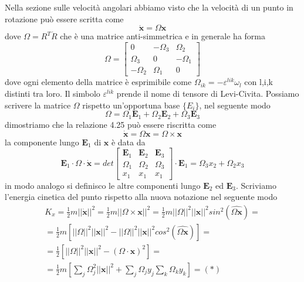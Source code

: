 Nella sezione sulle velocit\`{a} angolari abbiamo visto che la velocit\`{a} di un punto in rotazione pu\`{o} essere scritta come 
\begin{equation}
	\bm{\dot{x}} = \Omega \bm{x} 
\end{equation}
dove $\Omega = R^T\dot{R}$ che \`{e} una matrice anti-simmetrica e in generale ha forma 
\begin{equation}
\Omega=\left[\begin{array}{ccc}
0 & -\Omega_3 & \Omega_2 \\
\Omega_3 & 0 & -\Omega_1 \\
-\Omega_2 & \Omega_1 & 0
\end{array}\right]
\end{equation}
dove ogni elemento della matrice \`{e} esprimibile come $\Omega_{ik} = - \varepsilon^{lik}\omega_{l}$ con l,i,k distinti tra loro. Il simbolo $\varepsilon^{lik}$ prende il nome di tensore di Levi-Civita.
Possiamo scrivere la matrice $\Omega$ rispetto un'opportuna base $\{ E_i\}$, nel seguente modo
\begin{equation}
	\Omega = \Omega_1 \bm{E}_1 + \Omega_2 \bm{E}_2 + \Omega_3 \bm{E}_3
\end{equation}
dimostriamo che la relazione 4.25 pu\`{o} essere riscritta come
\begin{equation}
	\dot{\bm{x}} = \Omega\bm{x} = \Omega \times \bm{x}
\end{equation}
la componente lungo $\bm{E}_{1}$ di $\bm{x}$ \`{e} data da 
\begin{equation}
	\bm{E}_1 \cdot \Omega \cdot \bm{\dot{x}} = det \left [ \begin{array}{ccc}
		\bm{E}_1 & \bm{E}_{2} & \bm{E}_{3} \\
		\Omega_{1} & \Omega_{2} & \Omega_{3}\\
		x_1 & x_1 & x_1
	\end{array}\right] \cdot \bm{E}_{1} = \Omega_{3}x_{2} + \Omega_{2}x_{3}
\end{equation}  
in modo analogo si definisco le altre componenti lungo $\bm{E}_2$ ed $\bm{E}_3$. Scriviamo l'energia cinetica del punto rispetto alla nuova notazione nel seguente modo
\begin{equation}
\begin{aligned}
	& K_{x} = \frac{1}{2}m ||\bm{\dot{x}}||^2 = \frac{1}{2}m ||\Omega \times \bm{x}||^2 = \frac{1}{2}m||\Omega||^2||\bm{x}||^2sin^2(\widehat{\Omega \bm{x}}) = &\\[0.2in]
	& =\frac{1}{2}m \left [ ||\Omega||^2||\bm{x}||^2 - ||\Omega||^2||\bm{x}||^2cos^2(\widehat{\Omega \bm{x}}) \right ] = &\\[0.2in]
	& = \frac{1}{2} \left [ ||\Omega||^2||\bm{x}||^2 - ( \Omega \cdot \bm{x})^2 \right ] = & \\[0.2in]
	& = \frac{1}{2}m \left [ \sum_{j} \Omega_j^2||\bm{x}||^2 + \sum_{j}\Omega_j y_j \sum_{k} \Omega_k y_k \right ] = (*)
\end{aligned}
\end{equation}
